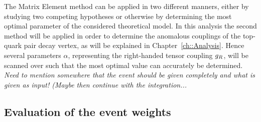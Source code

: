 The Matrix Element method can be applied in two different manners, either by studying two competing hypotheses or otherwise by determining the most optimal parameter of the considered theoretical model.
In this analysis the second method will be applied in order to determine the anomalous couplings of the top-quark pair decay vertex, as will be explained in Chapter~\ref{ch::Analysis}. Hence several parameters $\alpha$, representing the right-handed tensor coupling $g_{R}$, will be scanned over such that the most optimal value can accurately be determined.
\\

\textit{Need to mention somewhere that the event should be given completely and what is given as input! (Maybe then continue with the integration...}

\subsection{Evaluation of the event weights}

